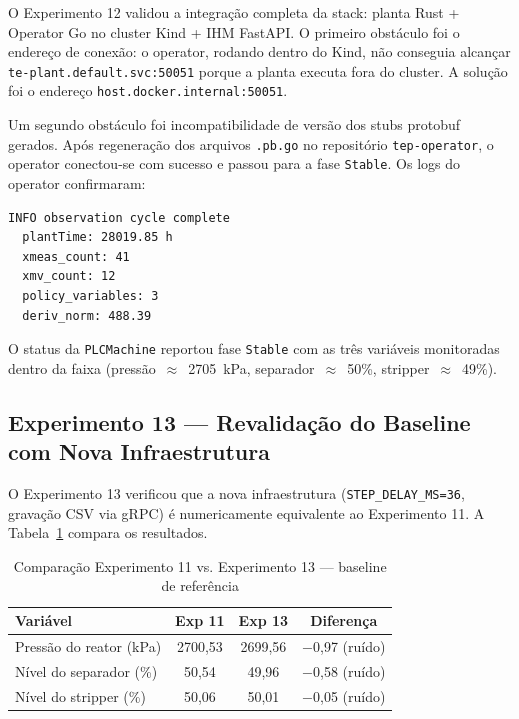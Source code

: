 O Experimento 12 validou a integração completa da stack: planta Rust + Operator Go no cluster Kind + IHM FastAPI. O primeiro obstáculo foi o endereço de conexão: o operator, rodando dentro do Kind, não conseguia alcançar \texttt{te-plant.default.svc:50051} porque a planta executa fora do cluster. A solução foi o endereço \texttt{host.docker.internal:50051}.

Um segundo obstáculo foi incompatibilidade de versão dos stubs protobuf gerados. Após regeneração dos arquivos \texttt{.pb.go} no repositório \texttt{tep-operator}, o operator conectou-se com sucesso e passou para a fase \texttt{Stable}. Os logs do operator confirmaram:

\begin{lstlisting}[caption={Log do operator após conectividade estabelecida}]
INFO observation cycle complete
  plantTime: 28019.85 h
  xmeas_count: 41
  xmv_count: 12
  policy_variables: 3
  deriv_norm: 488.39
\end{lstlisting}

O status da \texttt{PLCMachine} reportou fase \texttt{Stable} com as três variáveis monitoradas dentro da faixa (pressão~$\approx$~2705~kPa, separador~$\approx$~50\%, stripper~$\approx$~49\%).

\subsection{Experimento 13 — Revalidação do Baseline com Nova Infraestrutura}

O Experimento 13 verificou que a nova infraestrutura (\texttt{STEP\_DELAY\_MS=36}, gravação CSV via gRPC) é numericamente equivalente ao Experimento 11. A Tabela~\ref{tab:exp13} compara os resultados.

\begin{table}[ht!]
\centering
\caption{Comparação Experimento 11 vs. Experimento 13 — baseline de referência}
\label{tab:exp13}
\begin{tabular}{|l|c|c|c|}
\hline
\textbf{Variável} & \textbf{Exp 11} & \textbf{Exp 13} & \textbf{Diferença} \\
\hline
Pressão do reator (kPa)    & 2700,53 & 2699,56 & $-$0,97 (ruído) \\
Nível do separador (\%)    & 50,54   & 49,96   & $-$0,58 (ruído) \\
Nível do stripper (\%)     & 50,06   & 50,01   & $-$0,05 (ruído) \\
\hline
\end{tabular}
\end{table}

